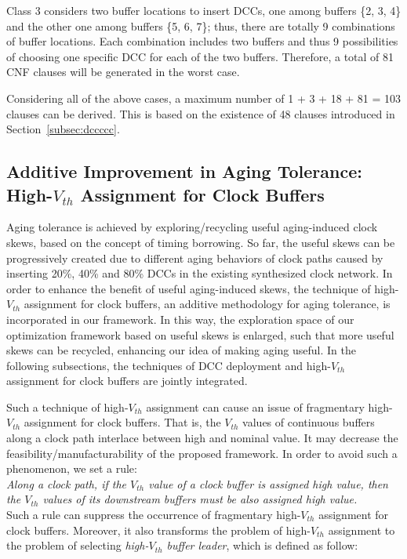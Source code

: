 Class 3 considers two buffer locations to insert DCCs, one among buffers \{2, 3, 4\} and the other one among buffers \{5, 6, 7\}; thus, there are totally 9 combinations of buffer locations. Each combination includes two buffers and thus 9 possibilities of choosing one specific DCC for each of the two buffers. Therefore, a total of 81 CNF clauses will be generated in the worst case.

Considering all of the above cases, a maximum number of 1 + 3 + 18 + 81 = 103 clauses can be derived. This is based on the existence of 48 clauses introduced in Section~\ref{subsec:dccccc}.

\subsection{Additive Improvement in Aging Tolerance: High-$V_{th}$ Assignment for Clock Buffers}
\label{sec:VTA}
Aging tolerance is achieved by exploring/recycling useful aging-induced clock skews, based on the concept of timing borrowing. So far, the useful skews can be progressively created due to different aging behaviors of clock paths caused by inserting 20\%, 40\% and 80\% DCCs in the existing synthesized clock network. In order to enhance the benefit of useful aging-induced skews, the technique of high-$V_{th}$ assignment for clock buffers, an additive methodology for aging tolerance, is incorporated in our framework. In this way, the exploration space of our optimization framework based on useful skews is enlarged, such that more useful skews can be recycled, enhancing our idea of making aging useful. In the following subsections, the techniques of DCC deployment and high-$V_{th}$ assignment for clock buffers are jointly integrated.

Such a technique of high-$V_{th}$ assignment can cause an issue of fragmentary high-$V_{th}$ assignment for clock buffers. That is, the $V_{th}$ values of continuous buffers along a clock path interlace between high and nominal value. It may decrease the feasibility/manufacturability of the proposed framework. In order to avoid such a phenomenon, we set a rule:\\

\textit{Along a clock path, if the $V_{th}$ value of a clock buffer is assigned high value, then the $V_{th}$ values of its downstream buffers must be also assigned high value.}\\

Such a rule can suppress the occurrence of fragmentary high-$V_{th}$ assignment for clock buffers. Moreover, it also transforms the problem of high-$V_{th}$ assignment to the problem of selecting \textit{high-$V_{th}$ buffer leader}, which is defined as follow:\\

